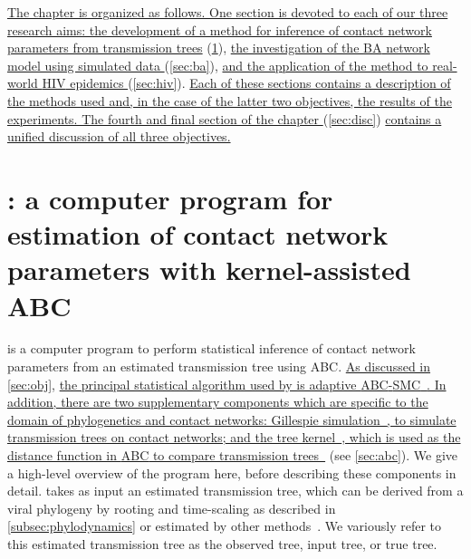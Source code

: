 

{\color{blue}\uline{
The chapter is organized as follows. One section is devoted to each of our
three research aims: the development of a method for inference of contact
network parameters from transmission trees} (\cref{sec:netabc}), \uline{the
investigation of the \acrlong{BA} network model using simulated data
}(\cref{sec:ba}), \uline{ and the application of the method to real-world
\gls{HIV} epidemics }(\cref{sec:hiv}). \uline{Each of these sections contains a
description of the methods used and, in the case of the latter two objectives,
the results of the experiments. The fourth and final section of the chapter
}(\cref{sec:disc}) \uline{contains a unified discussion of all three
objectives. }}

\section{: a computer program for estimation of contact
network parameters with kernel-assisted ABC}
\label{sec:netabc}

 is a computer program to perform statistical inference of
contact network parameters from an estimated transmission tree using
\gls{ABC}. {\color{blue}\uline{As discussed in }\cref{sec:obj}, \uline{the principal
statistical algorithm used by  is adaptive
\gls{ABC}-\gls{SMC}~\autocite{del2012adaptive}. In addition, there are two
supplementary components which are specific to the domain of phylogenetics and
contact networks: Gillespie simulation~\autocite{gillespie1976general}, to
simulate transmission trees on contact networks; and the tree
kernel~\autocite{poon2013mapping}, which is used as the distance function in
\gls{ABC} to compare transmission trees~\autocite{poon2015phylodynamic}} (see
\cref{sec:abc}).} We give a high-level overview of the program here, before
describing these components in detail.  takes as input an
estimated transmission tree, which can be derived from a viral phylogeny by
rooting and time-scaling as described in \cref{subsec:phylodynamics} or
estimated by other methods~\autocite{cottam2008integrating,
jombart2011reconstructing, ypma2012unravelling, morelli2012bayesian,
didelot2014bayesian, hall2015epidemic}. We variously refer to this estimated
transmission tree as the observed tree, input tree, or true tree.


